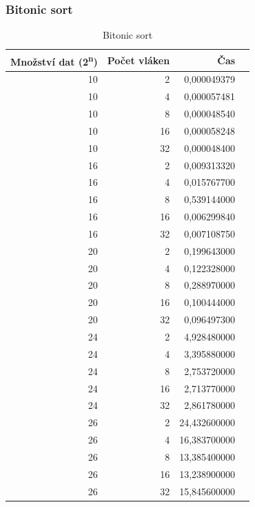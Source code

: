 \documentclass[12pt]{article}
\begin{document}
\subsubsection{Bitonic sort}
\begin{table}[H]
\begin{center}
\begin{tabular}{|r|r|r|r|}
\hline Množství dat (2\textsuperscript{n}) & Počet vláken & Čas \\ \hline
10 & 2  & 0,000049379 \\ \hline
10 & 4  & 0,000057481 \\ \hline
10 & 8  & 0,000048540 \\ \hline
10 & 16 & 0,000058248 \\ \hline
10 & 32 & 0,000048400 \\ \hline
16 & 2  & 0,009313320 \\ \hline
16 & 4  & 0,015767700 \\ \hline
16 & 8  & 0,539144000 \\ \hline
16 & 16 & 0,006299840 \\ \hline
16 & 32 & 0,007108750 \\ \hline
20 & 2  & 0,199643000 \\ \hline
20 & 4  & 0,122328000 \\ \hline
20 & 8  & 0,288970000 \\ \hline
20 & 16 & 0,100444000 \\ \hline
20 & 32 & 0,096497300 \\ \hline
24 & 2  & 4,928480000 \\ \hline
24 & 4  & 3,395880000 \\ \hline
24 & 8  & 2,753720000 \\ \hline
24 & 16 & 2,713770000 \\ \hline
24 & 32 & 2,861780000 \\ \hline
26 & 2  & 24,432600000 \\ \hline
26 & 4  & 16,383700000 \\ \hline
26 & 8  & 13,385400000 \\ \hline
26 & 16 & 13,238900000 \\ \hline
26 & 32 & 15,845600000 \\ \hline
\end{tabular} 
\end{center}
\caption{Bitonic sort}
\end{table}
\end{document}
